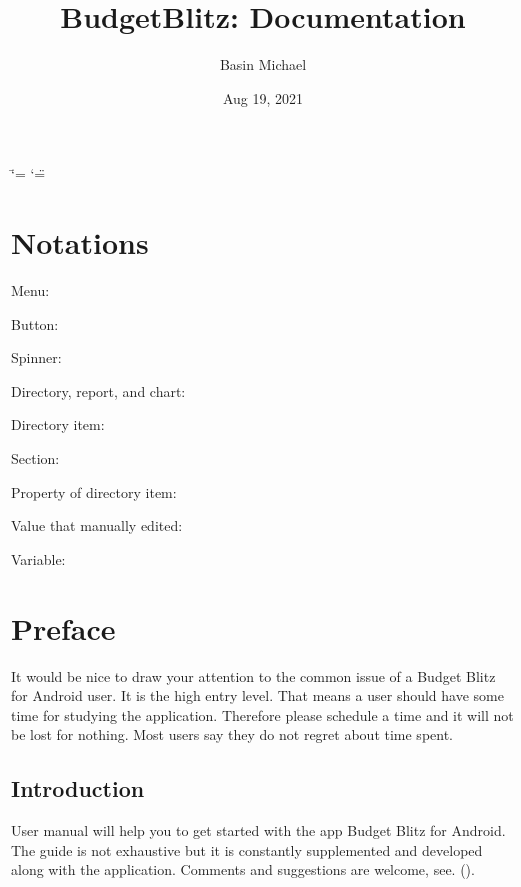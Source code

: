 \documentclass[a4paper,10pt,english]{sphinxmanual}
\title{BudgetBlitz: Documentation}
\date{Aug 19, 2021}
\author{Basin Michael}
\begin{document}
\ifdefined\shorthandoff
  \ifnum\catcode`\=\string=\active\shorthandoff{=}\fi
  \ifnum\catcode`\"=\active{}\fi
\fi

\pagestyle{empty}
\sphinxmaketitle
\pagestyle{plain}
\sphinxtableofcontents
\pagestyle{normal}
\label{\detokenize{index::doc}}



\chapter{Notations}
\label{\detokenize{notations:notations}}\label{\detokenize{notations::doc}}
Menu: 

Button: 

Spinner: 

Directory, report, and chart: 

Directory item: 

Section: 

Property of directory item: 

Value that manually edited:  

Variable: 


\chapter{Preface}
\label{\detokenize{preface:preface}}\label{\detokenize{preface::doc}}
It would be nice to draw your attention to the common issue of a Budget Blitz for Android user. It is the high entry level.
That means a user should have some time for studying the application. Therefore please schedule a time
and it will not be lost for nothing. Most users say they do not regret about time spent.


\section{Introduction}
\label{\detokenize{preface:introduction}}
User manual will help you to get started with the app Budget Blitz for Android. The guide is not exhaustive but it is constantly
supplemented and developed along with the application. Comments and suggestions are welcome,
see. {\hyperref[\detokenize{preface:feedback}]{}} ().
\end{document}
